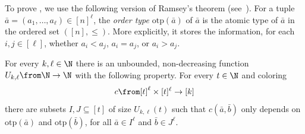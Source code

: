 To prove ,
we use the following version of Ramsey's theorem (see~\cite[full version, Lemma~4.4]{flip-breakability}).
\newcommand{\otp}{\mathrm{otp}}
For a tuple $\bar a=(a_1,\ldots,a_\ell)\in[n]^\ell$,
the \emph{order type} $\otp(\bar a)$ of
$\bar a$ is the atomic type of $\bar a$ in the ordered set $([n],\le)$.
More explicitly, it stores the information, for each $i,j\in[\ell]$,
whether $a_i<a_j$, $a_i=a_j$, or $a_i>a_j$.

\begin{lemma}\label{lem:bip-ramsey}
    For every $k,\ell\in\N$
    there is an unbounded, non-decreasing function $U_{k,\ell}\from\N\to\N$ with the following property.
For every $t\in\N$ and coloring
    $$c\from [t]^{\ell}\times [t]^{\ell}\to [k]$$
    there
    are subsets $I,J\subseteq [t]$ of size $U_{k,\ell}(t)$ such that $c(\bar a,\bar b)$ only depends on $\otp(\bar a)$ and $\otp(\bar b)$, for all $\bar a\in I^\ell$ and $\bar b\in J^{\ell}$.
\end{lemma}

